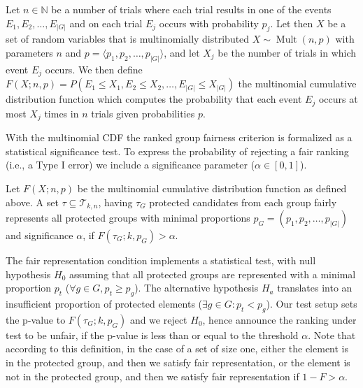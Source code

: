 \begin{definition}
	\label{def:multinomialCDF}
	Let $ n \in \mathbb{N}$ be a number of trials where each trial results in one of the events $ E_1, E_2, \ldots, E_{|G|} $ and on each trial $ E_j $ occurs with probability $ p_j $.
	Let then $X$ %
	be a set of random variables that is multinomially distributed $ X \sim \operatorname{Mult}(n, p)$ with parameters $ n $ and $ p = \langle p_1, p_2, \ldots, p_{|G|} \rangle$, and let $ X_j $ be the number of trials in which event $ E_j $ occurs.
	We then define $ F\left(X; n, p\right) = P\left(E_1 \leq X_1, E_2 \leq X_2, \ldots, E_{|G|} \leq X_{|G|}\right)$ the multinomial cumulative distribution function which computes the probability that each event $ E_j $ occurs at most $ X_j $ times in $ n $ trials given probabilities $ p $.
\end{definition}
With the multinomial CDF the ranked group fairness criterion is formalized as a statistical significance test.
%
To express the probability of rejecting a fair ranking (i.e., a Type I error) we include a significance parameter ($\alpha \in [0,1]$).

\begin{definition}
	\label{def:fair-representation-condition}
	Let $F(X;n,p)$ be the multinomial cumulative distribution function as defined above.
	A set $\tau \subseteq \mathcal{T}_{k,n}$, having $\tau_G$ protected candidates from each group fairly represents all protected groups with minimal proportions $p_G = (p_1, p_2, \ldots, p_{|G|})$ and significance $\alpha$,
	if $F(\tau_G;k,p_G) > \alpha$.
\end{definition}

The fair representation condition implements a statistical test, with null hypothesis $H_0$ assuming that all protected groups are represented with a minimal proportion $p_t$ ($\forall g \in G, p_t \ge p_g$).
%
The alternative hypothesis $H_a$ translates into an insufficient proportion of protected elements ($\exists g \in G: p_t < p_g$).
%
Our test setup sets the p-value to $F(\tau_G; k, p_G)$ and we reject $H_0$, hence announce the ranking under test to be unfair, if the p-value is less than or equal to the threshold $\alpha$.
%
Note that according to this definition, in the case of a set of size one, either the element is in the protected group, and then we satisfy fair representation, or the element is not in the protected group, and then we satisfy fair representation if $1 - F > \alpha$.

